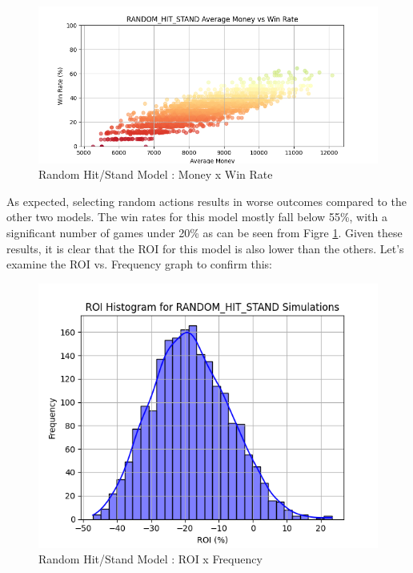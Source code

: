 \documentclass[a4paper,12pt]{report}
\begin{document}
\begin{figure}[h]
\begin{center}
\includegraphics[scale=0.55]{figures/graphs/rhs_money_wr_big.png}
\end{center}
\caption{Random Hit/Stand Model : Money x Win Rate}
\label{fig:rhs_money_wr}
\end{figure}

As expected, selecting random actions results in worse outcomes compared to the other two models. The win rates for this model mostly fall below 55\%, with a significant number of games under 20\% as can be seen from Figre \ref{fig:rhs_money_wr}. Given these results, it is clear that the ROI for this model is also lower than the others. Let's examine the ROI vs. Frequency graph to confirm this:

\begin{figure}[h]
\begin{center}
\includegraphics[scale=0.6]{figures/graphs/rhs_roi.png}
\end{center}
\caption{Random Hit/Stand Model : ROI x Frequency}
\label{fig:rhs_roi}
\end{figure}
\end{document}
